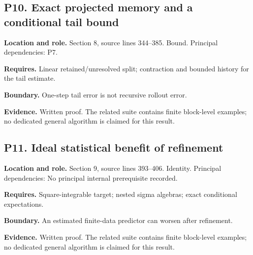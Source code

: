 \documentclass[11pt,oneside,openany]{book}
\numberwithin{equation}{section}
\begin{document}
\par\noindent\begin{minipage}{\textwidth}
\subsection{P10. Exact projected memory and a conditional tail
bound}\label{LSMRegister:p10.-exact-projected-memory-and-a-conditional-tail-bound}

\textbf{Location and role.} Section 8, source lines 344--385. Bound.
Principal dependencies: P7.

\textbf{Requires.} Linear retained/unresolved split; contraction and
bounded history for the tail estimate.

\textbf{Boundary.} One-step tail error is not recursive rollout error.

\textbf{Evidence.} Written proof. The related suite contains finite
block-level examples; no dedicated general algorithm is claimed for this
result.
\end{minipage}\par\medskip

\par\noindent\begin{minipage}{\textwidth}
\subsection{P11. Ideal statistical benefit of
refinement}\label{LSMRegister:p11.-ideal-statistical-benefit-of-refinement}

\textbf{Location and role.} Section 9, source lines 393--406. Identity.
Principal dependencies: No principal internal prerequisite recorded.

\textbf{Requires.} Square-integrable target; nested sigma algebras;
exact conditional expectations.

\textbf{Boundary.} An estimated finite-data predictor can worsen after
refinement.

\textbf{Evidence.} Written proof. The related suite contains finite
block-level examples; no dedicated general algorithm is claimed for this
result.
\end{minipage}\par\medskip
\end{document}
